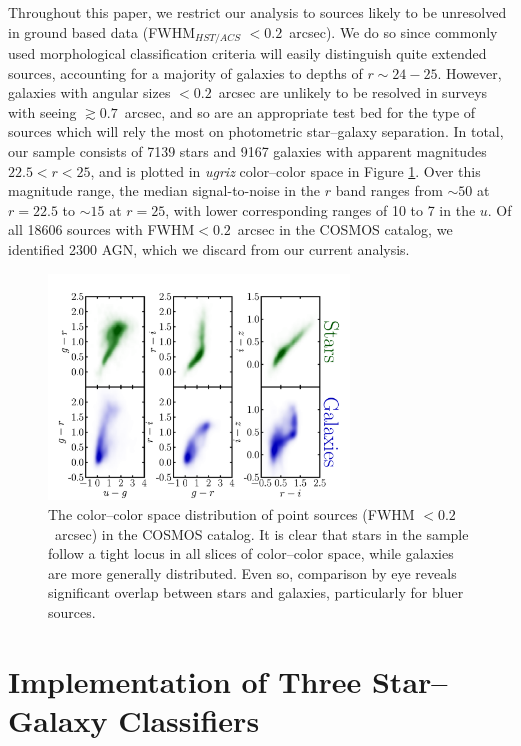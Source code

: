 \documentclass[12pt,preprint]{aastex}
\begin{document}
Throughout this paper, we restrict our analysis to sources likely to
be unresolved in ground based data (FWHM$_{HST/ACS}$ $< 0.2$~arcsec).  We
do so since commonly used morphological classification criteria will
easily distinguish quite extended sources, accounting for a majority
of galaxies to depths of $r\sim24-25$.  However, galaxies with angular
sizes $< 0.2$~arcsec are unlikely to be resolved in surveys with seeing
$\gtrsim0.7$~arcsec, and so are an appropriate test bed for the type of sources
which will rely the most on photometric star--galaxy separation.  In
total, our sample consists of 7139 stars and 9167 galaxies with apparent 
magnitudes $22.5<r<25$, and is plotted in {\it ugriz} color--color space in
Figure \ref{fig:color-color-data}.  Over this magnitude range, the median 
signal-to-noise in the $r$ band ranges from $\sim50$ at $r=22.5$ to 
$\sim15$ at $r=25$, with lower corresponding ranges of 10 to 7 in the $u$.  
Of all 18606 sources with FWHM$<0.2$~arcsec in the COSMOS catalog, we 
identified 2300 AGN, which we discard from our current analysis. 

\begin{figure}
\centering
 \includegraphics[clip=true, trim=0cm 0cm 0.0cm 0.cm,width=8cm]{fig2.pdf}
\caption{The color--color space distribution of point sources (FWHM $<
  0.2$~arcsec) in the COSMOS catalog.  It is clear that stars in the sample
  follow a tight locus in all slices of color--color space, while
  galaxies are more generally distributed.  Even so, comparison by eye
  reveals significant overlap between stars and galaxies, particularly
  for bluer sources.}
\label{fig:color-color-data}
\end{figure}

%
%


\section{Implementation of Three Star--Galaxy Classifiers}
\label{sec:specifics}
\end{document}
